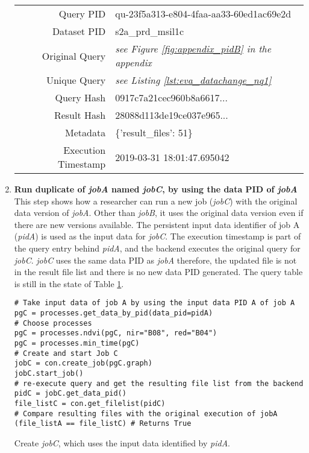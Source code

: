 \documentclass[draft,final]{vutinfth} %
\newenvironment{code}{\captionsetup{type=listing}}{}
\begin{document}
\begin{enumerate}
\begin{table}[]
\begin{tabular}{|r|l|}
			Query PID & { \color{red} qu-23f5a313-e804-4faa-aa33-60ed1ac69e2d}  \\ 
			Dataset PID & s2a\_prd\_msil1c  \\ 
			Original Query & \textit{see Figure \ref{fig:appendix_pidB} in the appendix} \\
			Unique Query & \textit{see Listing \ref{lst:eva_datachange_nq1}}  \\
			Query Hash & {\color{blue}0917c7a21cec960b8a6617...}  \\
			Result Hash & {\color{red}28088d113de19ce037e965...}  \\
			Metadata & \{'result\_files': 51\}  \\
			Execution Timestamp & 2019-03-31 18:01:47.695042   \\ \hline
		\end{tabular}
		\label{Tab:eva_datachanges3}
	\end{table}
	\newpage
	\item \textbf{Run duplicate of \textit{jobA} named \textit{jobC}, by using the data PID of \textit{jobA} }\\
	This step shows how a researcher can run a new job (\textit{jobC}) with the original data version of \textit{jobA}. Other than \textit{jobB}, it uses the original data version even if there are new versions available. The persistent input data identifier of job A (\textit{pidA}) is used as the input data for \textit{jobC}. The execution timestamp is part of the query entry behind \textit{pidA}, and the backend executes the original query for \textit{jobC}. \textit{jobC} uses the same data PID as \textit{jobA} therefore, the updated file is not in the result file list and there is no new data PID generated. The query table is still in the state of Table \ref{Tab:eva_datachanges3}. 
	\begin{code}
		\begin{verbatim}
# Take input data of job A by using the input data PID A of job A
pgC = processes.get_data_by_pid(data_pid=pidA)
# Choose processes
pgC = processes.ndvi(pgC, nir="B08", red="B04")
pgC = processes.min_time(pgC)
# Create and start Job C
jobC = con.create_job(pgC.graph)
jobC.start_job()
# re-execute query and get the resulting file list from the backend
pidC = jobC.get_data_pid()
file_listC = con.get_filelist(pidC)
# Compare resulting files with the original execution of jobA
(file_listA == file_listC) # Returns True
		\end{verbatim}
		\caption{Create \textit{jobC}, which uses the input data identified by \textit{pidA}.}
		\label{lst:eva_datachange_5}
	\end{code}
\end{enumerate}
\end{document}
